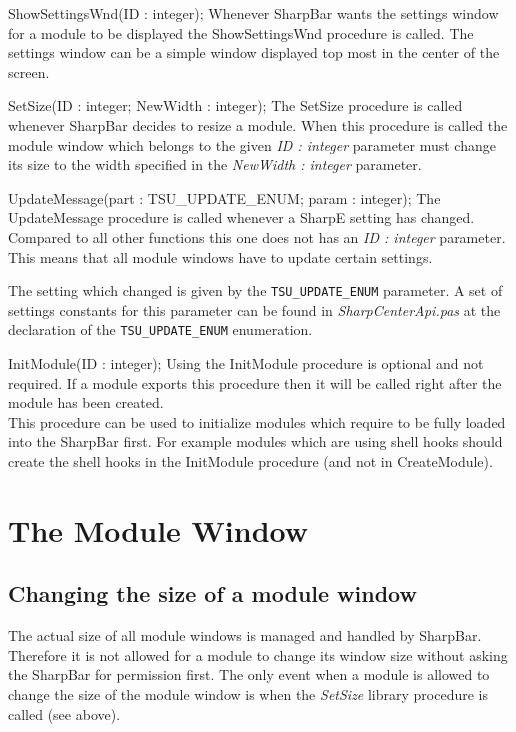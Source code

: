 \documentclass[a4paper]{article}
\begin{document}
\begin{description}
      \bigbreak
    \item[]{ ShowSettingsWnd(ID : integer);}  \medbreak
      Whenever SharpBar wants the settings window for a module to be displayed the ShowSettingsWnd procedure is called. The settings window can be a simple window displayed top most in the center of the screen. 
      
      \bigbreak
    \item[]{ SetSize(ID : integer; NewWidth : integer);}  \medbreak
      The SetSize procedure is called whenever SharpBar decides to resize a module.
      When this procedure is called the module window which belongs to the given {\it ID : integer} parameter must change its size to the width specified in the {\it NewWidth : integer} parameter.     
      
      \bigbreak
    \item[]{ UpdateMessage(part : TSU_UPDATE_ENUM; param : integer);}  \medbreak
      The UpdateMessage procedure is called whenever a SharpE setting has changed. Compared to all other functions this one does not has an {\it ID : integer} parameter. This means that all module windows have to update certain settings.

      The setting which changed is given by the \verb+TSU_UPDATE_ENUM+ parameter. A set of settings constants for this parameter can be found in {\it SharpCenterApi.pas} at the declaration of the \verb+TSU_UPDATE_ENUM+ enumeration. 
      
      \bigbreak
    \item[]{ InitModule(ID : integer);}  \medbreak
      Using the InitModule procedure is optional and not required. If a module exports this procedure then it will be called right after the module has been created. \\
      This procedure can be used to initialize modules which require to be fully loaded into the SharpBar first. For example modules which are using shell hooks should create the shell hooks in the InitModule procedure (and not in CreateModule).
      
      \bigbreak
  \end{description}
  
\section{The Module Window}
  \subsection{Changing the size of a module window}
    The actual size of all module windows is managed and handled by SharpBar. Therefore it is not allowed for a module to change its window size without asking the SharpBar for permission first. The only event when a module is allowed to change the size of the module window is when the {\it SetSize} library procedure is called (see above). 
\end{document}
